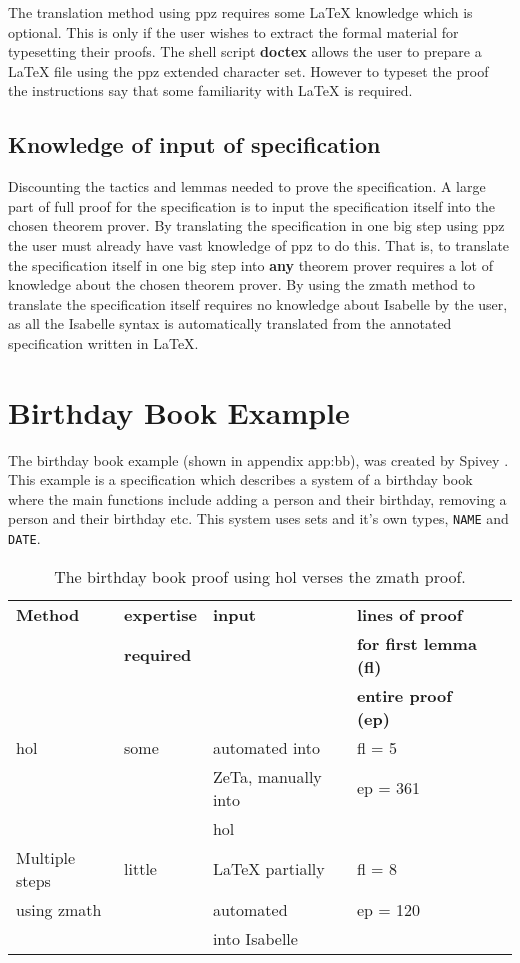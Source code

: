 The translation method using \gls{ppz} requires some \LaTeX{} knowledge which is
optional. This is only if the user wishes to extract the formal material for
typesetting their proofs. The shell script \textbf{doctex} allows the user to
prepare a \LaTeX{} file using the \gls{ppz} extended character set. However to
typeset the proof the instructions say that some familiarity with \LaTeX{} is
required.

\subsection{Knowledge of input of specification}
Discounting the tactics and lemmas needed to prove the specification. A large
part of full proof for the specification is to input the specification itself
into the chosen theorem prover. By translating the specification in one big step
using \gls{ppz} the user must already have vast knowledge of \gls{ppz} to do
this. That is, to translate the specification itself in one big step into
\textbf{any} theorem prover requires a lot of knowledge about the chosen theorem
prover. By using the \gls{zmath} method to translate the specification itself
requires no knowledge about Isabelle by the user, as all the Isabelle syntax is
automatically translated from the annotated specification written in \LaTeX{}. 

\section{Birthday Book Example}

The birthday book example (shown in appendix {app:bb}), was created by Spivey
\cite{spiveyreferencemanual}. This example is a specification which describes a
system of a birthday book where the main functions include adding a person and
their birthday, removing a person and their birthday etc. This system uses sets
and it's own types, \texttt{NAME} and \texttt{DATE}.

\begin{table}[H]
\begin{center}
\begin{tabular}{| l || l | l | l | l |}
\hline
\textbf{Method} & \textbf{expertise} &  \textbf{input} & \textbf{lines of proof}
\\
& \textbf{required} & & \textbf{for first lemma (fl)}  \\
& & & \textbf{entire proof (ep)} \\
\hline
 \gls{hol} & some  & automated into  & fl = 5  \\
 & & ZeTa, manually into & ep = 361 \\
& & \gls{hol} & \\
\hline
 Multiple steps &  little & \LaTeX{} partially  & fl = 8  \\
using \gls{zmath} & & automated & ep = 120 \\
&  & into Isabelle &  \\
\hline
\end{tabular}
\end{center}
\caption{The birthday book proof using \gls{hol} verses the \gls{zmath} proof.}
\label{tab:comparebb}
\end{table}

